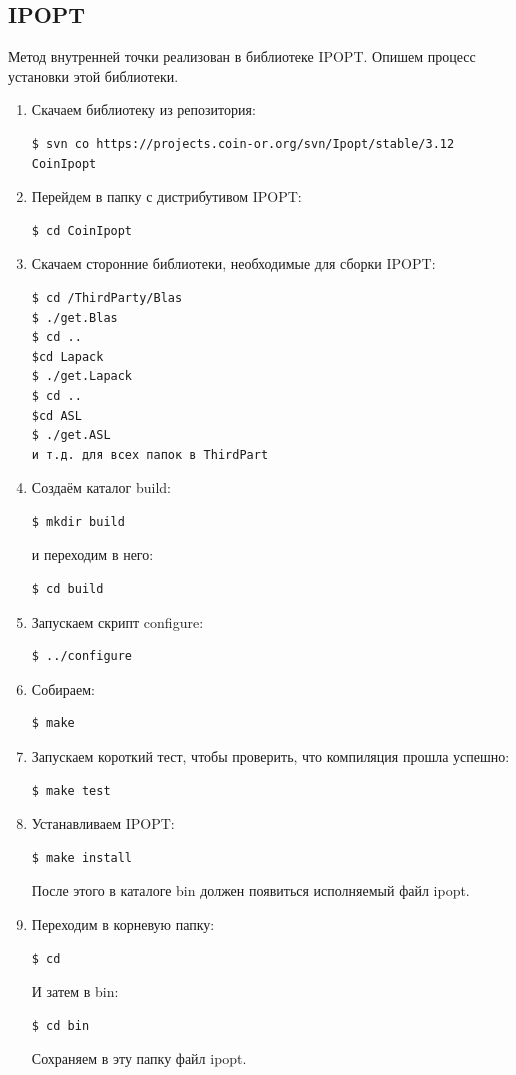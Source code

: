 \documentclass[14pt,fleqn,a4paper]{scrartcl}
\begin{document}
\subsection{IPOPT}
Метод внутренней точки реализован в библиотеке IPOPT. Опишем процесс установки этой библиотеки.
\begin{enumerate} 
\item Скачаем библиотеку из репозитория:
\begin{verbatim}
$ svn co https://projects.coin-or.org/svn/Ipopt/stable/3.12 CoinIpopt 
\end{verbatim}
\item Перейдем в папку с дистрибутивом IPOPT:
\begin{verbatim}
$ cd CoinIpopt
\end{verbatim}
\item Скачаем сторонние библиотеки, необходимые для сборки IPOPT:
\begin{verbatim}
$ cd /ThirdParty/Blas 
$ ./get.Blas 
$ cd ..
$cd Lapack 
$ ./get.Lapack 
$ cd ..
$cd ASL 
$ ./get.ASL
и т.д. для всех папок в ThirdPart
\end{verbatim}
\item Создаём каталог build:
\begin{verbatim}
$ mkdir build 
\end{verbatim}
и переходим в него:
\begin{verbatim}
$ cd build 
\end{verbatim}
\item Запускаем скрипт configure:
\begin{verbatim}
$ ../configure 
\end{verbatim}
\item Собираем:
\begin{verbatim}
$ make
\end{verbatim}
\item Запускаем короткий тест, чтобы проверить, что компиляция прошла успешно:
\begin{verbatim}
$ make test
\end{verbatim}
\item Устанавливаем IPOPT:
\begin{verbatim}
$ make install
\end{verbatim}
После этого в каталоге bin должен появиться исполняемый файл ipopt.
\item Переходим в корневую папку:
\begin{verbatim}
$ cd 
\end{verbatim}
И затем в bin:
\begin{verbatim}
$ cd bin
\end{verbatim}
Сохраняем в эту папку файл ipopt. 
\end{enumerate} 
\end{document}
